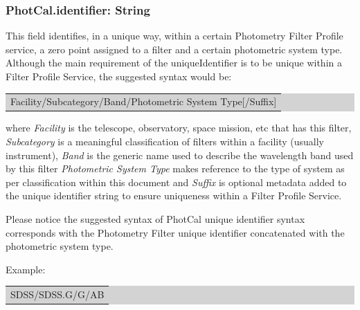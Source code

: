 \documentclass[11pt,a4paper]{ivoa}
\begin{document}
\subsubsection{PhotCal.identifier: String}
This field identifies, in a unique way, within a certain Photometry Filter Profile service, a zero point assigned to a filter and a certain photometric system type. Although the main requirement of the uniqueIdentifier is to be unique within a Filter Profile Service, the suggested syntax would be:
\par

\bigskip
\par
\begingroup\setlength{\fboxsep}{0pt}
\colorbox{lightgray}{%
\begin{tabular}{|p{5.53in}|}
Facility/Subcategory/Band/Photometric System Type[/Suffix]
\end{tabular}%
}\endgroup
\par
\bigskip


where \textit{Facility} is the telescope, observatory, space mission, etc that has this filter, \textit{Subcategory} is a meaningful classification of filters within a facility (usually instrument), \textit{Band} is the generic name used to describe the wavelength band used by this filter \textit{Photometric System Type} makes reference to the type of system as per classification within this document and \textit{Suffix} is optional metadata added to the unique identifier string to ensure uniqueness within a Filter Profile Service. 
\par

Please notice the suggested syntax of PhotCal unique identifier syntax corresponds with the Photometry Filter unique identifier concatenated with the photometric system type.
\par

Example: 
\par



\bigskip
\par
\begingroup\setlength{\fboxsep}{0pt}
\colorbox{lightgray}{%
\begin{tabular}{|p{5.53in}|}
SDSS/SDSS.G/G/AB
\end{tabular}%
}\endgroup
\par
\bigskip


\end{document}
